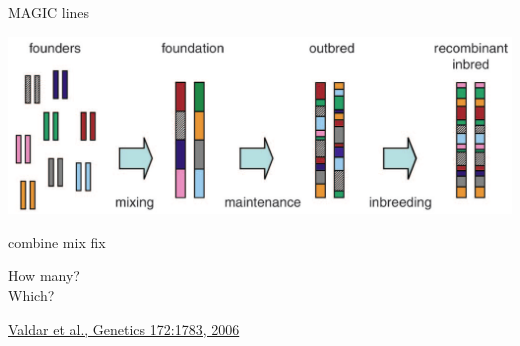 \documentclass[12pt]{article}
\newcommand{\headsize}{\fontsize{35}{35} \selectfont}
\newcommand{\smallsize}{\fontsize{25}{30} \selectfont}
\newcommand{\smallersize}{\fontsize{20}{25} \selectfont}
\newcommand{\smallestsize}{\fontsize{18}{22} \selectfont}
\begin{document}
\newpage

\addtocounter{page}{-1}

\headsize \color{myyellow}
\hfill \begin{minipage}{5.75in}
\centering
MAGIC lines
\end{minipage}

\vspace{20mm}

\centerline{\includegraphics[width=10in]{Figs/valdar_genet2006.png}}

\smallsize \color{myyellow}
\hspace*{52mm} combine \hspace*{35mm} mix \hspace*{52mm} fix

\smallersize
\color{mywhite}
\vspace{20pt}

\hspace*{6mm}
\begin{minipage}[t]{45mm}
\vspace*{0mm}
\centering

How many? \\[20pt]
Which?
\end{minipage}
\hspace{57mm}
\begin{minipage}[t]{45mm}
\vspace*{0mm}
\centering

\end{minipage}
\hspace{18mm}
\begin{minipage}[t]{45mm}
\vspace*{0mm}
\centering


\end{minipage}


\vfill

\hfill {\smallestsize \color{myblue} \href{http://www.genetics.org/content/172/3/1783.full}{Valdar et al., Genetics 172:1783, 2006}}

\vspace*{5mm}
\end{document}
